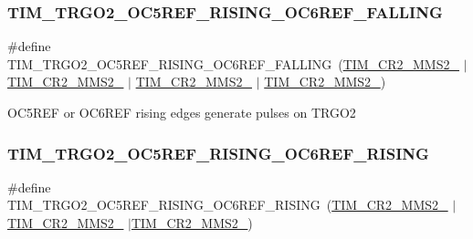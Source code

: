 \subsubsection{\texorpdfstring{TIM\_TRGO2\_OC5REF\_RISING\_OC6REF\_FALLING}{TIM\_TRGO2\_OC5REF\_RISING\_OC6REF\_FALLING}}
{\footnotesize\ttfamily \#define T\+I\+M\+\_\+\+T\+R\+G\+O2\+\_\+\+O\+C5\+R\+E\+F\+\_\+\+R\+I\+S\+I\+N\+G\+\_\+\+O\+C6\+R\+E\+F\+\_\+\+F\+A\+L\+L\+I\+NG~(\mbox{\hyperlink{group___peripheral___registers___bits___definition_ga3503937610adbf78153c1fcfa4bcd6ea}{T\+I\+M\+\_\+\+C\+R2\+\_\+\+M\+M\+S2\+\_}} $\vert$ \mbox{\hyperlink{group___peripheral___registers___bits___definition_gaa49670c71a446e5201994716b08b1527}{T\+I\+M\+\_\+\+C\+R2\+\_\+\+M\+M\+S2\+\_}} $\vert$ \mbox{\hyperlink{group___peripheral___registers___bits___definition_ga0248e35956d0d22ac66dcd67aab317c5}{T\+I\+M\+\_\+\+C\+R2\+\_\+\+M\+M\+S2\+\_}} $\vert$ \mbox{\hyperlink{group___peripheral___registers___bits___definition_ga07efe60d8d7305b78085233ddaecb990}{T\+I\+M\+\_\+\+C\+R2\+\_\+\+M\+M\+S2\+\_}})}

O\+C5\+R\+EF or O\+C6\+R\+EF rising edges generate pulses on T\+R\+G\+O2 \mbox{\label{group___t_i_m___master___mode___selection__2_ga98299af57d50ec9a0dc1fbd3d4d04c39}} 
\subsubsection{\texorpdfstring{TIM\_TRGO2\_OC5REF\_RISING\_OC6REF\_RISING}{TIM\_TRGO2\_OC5REF\_RISING\_OC6REF\_RISING}}
{\footnotesize\ttfamily \#define T\+I\+M\+\_\+\+T\+R\+G\+O2\+\_\+\+O\+C5\+R\+E\+F\+\_\+\+R\+I\+S\+I\+N\+G\+\_\+\+O\+C6\+R\+E\+F\+\_\+\+R\+I\+S\+I\+NG~(\mbox{\hyperlink{group___peripheral___registers___bits___definition_ga3503937610adbf78153c1fcfa4bcd6ea}{T\+I\+M\+\_\+\+C\+R2\+\_\+\+M\+M\+S2\+\_}} $\vert$ \mbox{\hyperlink{group___peripheral___registers___bits___definition_gaa49670c71a446e5201994716b08b1527}{T\+I\+M\+\_\+\+C\+R2\+\_\+\+M\+M\+S2\+\_}} $\vert$\mbox{\hyperlink{group___peripheral___registers___bits___definition_ga0248e35956d0d22ac66dcd67aab317c5}{T\+I\+M\+\_\+\+C\+R2\+\_\+\+M\+M\+S2\+\_}})}

